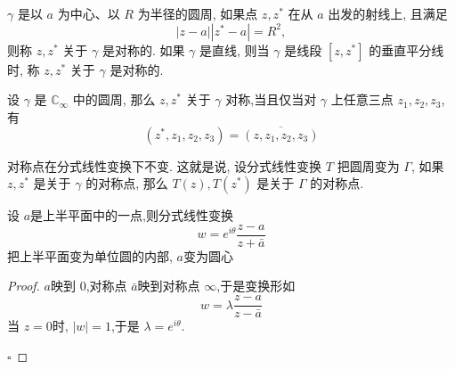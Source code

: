 \documentclass[../../复变函数.tex]{subfiles}
\begin{document}
\hspace*{\fill} 

\hspace*{\fill} 

\begin{definition}
    $\gamma$ 是以 $a$ 为中心、以 $R$ 为半径的圆周, 如果点 $z, z^*$ 在从 $a$ 出发的射线上, 且满足
\begin{equation}
|z-a||z^*-a|=R^2,
\end{equation}
则称 $z, z^*$ 关于 $\gamma$ 是对称的. 如果 $\gamma$ 是直线, 则当 $\gamma$ 是线段 $[z, z^*]$ 的垂直平分线时, 称 $z, z^*$ 关于 $\gamma$ 是对称的.
\end{definition}
\begin{proposition}
    设 $\gamma$ 是 $\mathbb{C}_\infty$ 中的圆周, 那么 $z, z^*$ 关于 $\gamma$ 对称,当且仅当对 $\gamma$ 上任意三点 $z_1, z_2, z_3$, 有
$$
(z^*, z_1, z_2, z_3) = \overline{(z, z_1, z_2, z_3)}
$$
\end{proposition}
\begin{theorem}
    对称点在分式线性变换下不变. 这就是说, 设分式线性变换 $T$ 把圆周变为 $\Gamma$, 如果 $z, z^*$ 是关于 $\gamma$ 的对称点, 那么 $T(z), T(z^*)$ 是关于 $\Gamma$ 的对称点.
\end{theorem}

\begin{example}
    设 \(  a  \)是上半平面中的一点,则分式线性变换 \[
    w= e^{i \theta }\frac{z-a }{z+ \bar{a} } 
    \]把上半平面变为单位圆的内部, \(  a  \)变为圆心  
\end{example}
\begin{proof}
     \(  a  \)映到 \(  0  \),对称点 \(  \bar{a}  \)映到对称点 \(  \infty  \),于是变换形如 \[
     w=  \lambda \frac{z-a }{z-\bar{a} } 
     \]当 \(  z= 0  \)时, \(  \left| w \right|= 1   \),于是 \(   \lambda = e^{i \theta }  \).       

    \hfill $\square$
\end{proof}
\hspace*{\fill} 
\end{document}
